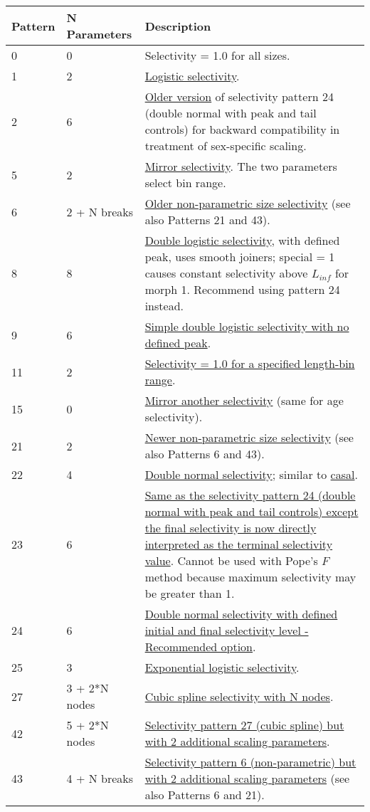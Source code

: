 \begin{longtable}{p{2cm} p{3cm} p{10cm}}
	Pattern & N Parameters & Description \Tstrut\Bstrut\\
	\hline
	0 \Tstrut & 0 & Selectivity = 1.0 for all sizes. \\
	1 \Tstrut & 2 & \hyperlink{LogisticSelectivity}{Logistic selectivity}. \\
	2 \Tstrut & 6 & \hyperlink{Pattern2}{Older version} of selectivity pattern 24 (double normal with peak and tail controls) for backward compatibility in treatment of sex-specific scaling. \\
	5 \Tstrut & 2 & \hyperlink{MirrorSelectivity}{Mirror selectivity}. The two parameters select bin range. \\
	6 \Tstrut & 2 + N breaks & \hyperlink{NonParamSelectivity6}{Older non-parametric size selectivity} (see also Patterns 21 and 43). \\
	8 \Tstrut & 8 & \hyperlink{DoubleLogSelectivity}{Double logistic selectivity}, with defined peak, uses smooth joiners; special = 1 causes constant selectivity above $L_{inf}$ for morph 1. Recommend using pattern 24 instead. \\
	9 \Tstrut & 6 & \hyperlink{SimpleDoubleLog}{Simple double logistic selectivity with no defined peak}. \\
	11 \Tstrut & 2 & \hyperlink{SelectivityOneRange}{Selectivity = 1.0 for a specified length-bin range}. \\
	15 \Tstrut & 0 & \hyperlink{MirrorAnotherSelectivity}{Mirror another selectivity} (same for age selectivity). \\
	21 \Tstrut & 2 & \hyperlink{NonParamSelectivity21}{Newer non-parametric size selectivity} (see also Patterns 6 and 43). \\
	22 \Tstrut & 4 & \hyperlink{DoubleNormalPlateau}{Double normal selectivity}; similar to \href{https://casal2.github.io/}{\gls{casal}}. \\
	23 \Tstrut & 6 & \hyperlink{DoubleNormalPeak}{Same as the selectivity pattern 24 (double normal with peak and tail controls) except the final selectivity is now directly interpreted as the terminal selectivity value}. Cannot be used with Pope's $F$ method because maximum selectivity may be greater than 1. \\
	24 \Tstrut & 6 & \hyperlink{DoubleNormalPeak}{Double normal selectivity with defined initial and final selectivity level - Recommended option}. \\
	25 \Tstrut & 3 & \hyperlink{ExponentialLogistic}{Exponential logistic selectivity}. \\
	27 \Tstrut & 3 + 2*N nodes & \hyperlink{cubic-spline}{Cubic spline selectivity with N nodes}. \\
	42 \Tstrut & 5 + 2*N nodes & \hyperlink{CubicSplineScaling}{Selectivity pattern 27 (cubic spline) but with 2 additional scaling parameters}. \\
	43 \Tstrut & 4 + N breaks & \hyperlink{NonParamScaling}{Selectivity pattern 6 (non-parametric) but with 2 additional scaling parameters} (see also Patterns 6 and 21). \Bstrut\\
	\hline
\end{longtable}


